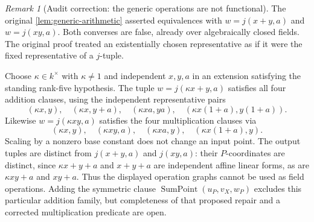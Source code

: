 \documentclass[11pt,oneside]{article}
\theoremstyle{definition}
\theoremstyle{remark}
\newtheorem{remark}[theorem]{Remark}
\begin{document}
\begin{remark}[Audit correction: the generic operations are not functional]
\label{rem:generic-arithmetic-audit}
The original \cref{lem:generic-arithmetic} asserted equivalences with
$w=j(x+y,a)$ and $w=j(xy,a)$. Both converses are false, already over algebraically
closed fields. The original proof treated an existentially chosen representative as
if it were the fixed representative of a $j$-tuple.

Choose $\kappa\in k^\times$ with $\kappa\neq1$ and independent $x,y,a$ in an extension
satisfying the standing rank-five hypothesis. The tuple $w=j(\kappa x+y,a)$ satisfies
all four addition clauses, using the independent representative pairs
\[
 (\kappa x,y),\quad(\kappa x,y+a),\quad(\kappa xa,ya),
 \quad(\kappa x(1+a),y(1+a)).
\]
Likewise $w=j(\kappa xy,a)$ satisfies the four multiplication clauses via
\[
 (\kappa x,y),\quad(\kappa xy,a),\quad(\kappa xa,y),
 \quad(\kappa x(1+a),y).
\]
Scaling by a nonzero base constant does not change an input point. The output tuples
are distinct from $j(x+y,a)$ and $j(xy,a)$: their $P$-coordinates are distinct, since
$\kappa x+y+a$ and $x+y+a$ are independent affine linear forms, as are $\kappa xy+a$
and $xy+a$. Thus the displayed operation graphs cannot be used as field operations.
Adding the symmetric clause $\operatorname{SumPoint}(u_P,v_X,w_P)$ excludes this
particular addition family, but completeness of that proposed repair and a corrected
multiplication predicate are open.


\end{remark}
\end{document}
